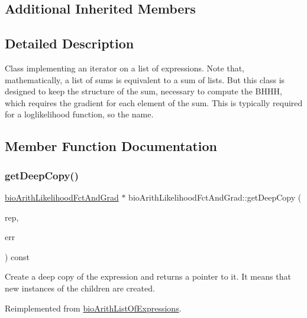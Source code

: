 \subsection*{Additional Inherited Members}


\subsection{Detailed Description}
Class implementing an iterator on a list of expressions. Note that, mathematically, a list of sums is equivalent to a sum of lists. But this class is designed to keep the structure of the sum, necessary to compute the B\+H\+HH, which requires the gradient for each element of the sum. This is typically required for a loglikelihood function, so the name. 

\subsection{Member Function Documentation}
\mbox{\label{classbio_arith_likelihood_fct_and_grad_a053e08511308e3c8a3e572f5c5f8f019}} 
\subsubsection{\texorpdfstring{get\+Deep\+Copy()}{getDeepCopy()}}
{\footnotesize\ttfamily \hyperlink{classbio_arith_likelihood_fct_and_grad}{bio\+Arith\+Likelihood\+Fct\+And\+Grad} $\ast$ bio\+Arith\+Likelihood\+Fct\+And\+Grad\+::get\+Deep\+Copy (\begin{DoxyParamCaption}\item[{\hyperlink{classbio_expression_repository}{bio\+Expression\+Repository} $\ast$}]{rep,  }\item[{pat\+Error $\ast$\&}]{err }\end{DoxyParamCaption}) const\hspace{0.3cm}{\ttfamily [virtual]}}

Create a deep copy of the expression and returns a pointer to it. It means that new instances of the children are created. 

Reimplemented from \hyperlink{classbio_arith_list_of_expressions_af13c0c6710776c02d3f7c0e27d5cd724}{bio\+Arith\+List\+Of\+Expressions}.

